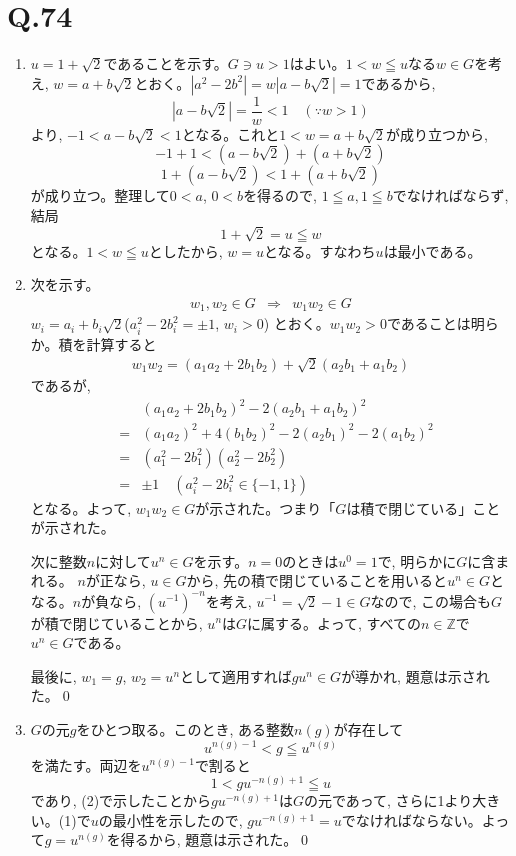 \documentclass[twocolumn]{jbook}
\newcommand{\ben}{\begin{enumerate}}
\newcommand{\een}{\end{enumerate}}
\newcommand{\beqn}{\begin{eqnarray*}}
\newcommand{\eeqn}{\end{eqnarray*}}
\newcommand{\nara}{\Rightarrow}
\newcommand{\mb}{\mathbb}
\renewcommand{\leq}{\leqq}
\begin{document}
\section*{Q.74}
\ben
\item $u=1+\sqrt{2}$であることを示す。$G\ni u>1$はよい。$1<w\leq u$なる$w\in G$を考え, $w=a+b\sqrt{2}$とおく。$|a^2-2b^2| = w|a-b\sqrt{2}|=1$であるから, 
\[|a-b\sqrt{2}| = \dfrac{1}{w} < 1 \quad (\because w>1)\]
より, $-1<a-b\sqrt{2} < 1$となる。これと$1<w=a+b\sqrt{2}$が成り立つから, 
\[-1+1 < (a-b\sqrt{2}) + (a+b\sqrt{2}) \]
\[1+(a-b\sqrt{2}) < 1 + (a+b\sqrt{2})\]
が成り立つ。整理して$0<a$, $0<b$を得るので, $1\leq a, 1\leq b$でなければならず, 結局
\[1+\sqrt{2} = u \leq w\]
となる。$1<w\leq u$としたから, $w=u$となる。すなわち$u$は最小である。
\item 次を示す。
\beqn
w_1, w_2\in G&\nara& w_1w_2\in G
\eeqn
$w_i=a_i+b_i\sqrt{2}$\quad ($a_i^2 - 2b_i^2 = \pm 1$, $w_i>0$) とおく。$w_1w_2 > 0$であることは明らか。積を計算すると
\beqn
w_1w_2 = (a_1a_2 + 2b_1b_2) + \sqrt{2}(a_2b_1 + a_1b_2)
\eeqn
であるが, 
\beqn
&&(a_1a_2 + 2b_1b_2) ^2 - 2(a_2b_1 + a_1b_2)^2\\
&=& (a_1a_2)^2 + 4(b_1b_2)^2 - 2(a_2b_1)^2 - 2(a_1b_2)^2\\
&=&(a_1^2 - 2b_1^2)(a_2^2-2b_2^2)\\
&=&\pm 1 \quad (a_i^2-2b_i^2 \in \{ -1,1 \})
\eeqn
となる。よって, $w_1w_2\in G$が示された。つまり「$G$は積で閉じている」ことが示された。\par
次に整数$n$に対して$u^{n}\in G$を示す。$n=0$のときは$u^{0}=1$で, 明らかに$G$に含まれる。
$n$が正なら, $u\in G$から, 先の積で閉じていることを用いると$u^{n}\in G$となる。$n$が負なら, $(u^{-1})^{-n}$を考え, $u^{-1} = \sqrt{2} -1 \in G$なので, この場合も$G$が積で閉じていることから, $u^n$は$G$に属する。よって, すべての$n \in \mb{Z}$で$u^n\in G$である。\par
最後に, $w_1=g$, $w_2=u^n$として適用すれば$gu^n\in G$が導かれ, 題意は示された。\qed
\item $G$の元$g$をひとつ取る。このとき, ある整数$n(g)$が存在して
\[u^{n(g)-1} < g \leq u^{n(g)}\]
を満たす。両辺を$u^{n(g)-1}$で割ると
\[1 < gu^{-n(g)+1} \leq u\]
であり, (2)で示したことから$gu^{-n(g)+1}$は$G$の元であって, さらに1より大きい。(1)で$u$の最小性を示したので, $gu^{-n(g)+1} = u$でなければならない。よって$g=u^{n(g)}$を得るから, 題意は示された。\qed


\een
\end{document}
